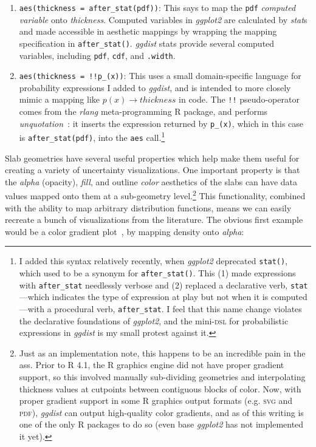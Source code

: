 \documentclass[journal]{vgtc}              %
\begin{document}
\begin{enumerate}
    \item \texttt{aes(thickness = after\_stat(pdf))}: This says to map the \texttt{pdf} \textit{computed variable} onto \textit{thickness}. Computed variables in \textit{ggplot2} are calculated by \textit{stat}s and made accessible in aesthetic mappings by wrapping the mapping specification in \texttt{after\_stat()}. \textit{ggdist} stats provide several computed variables, including \texttt{pdf}, \texttt{cdf}, and \texttt{.width}.
    \item \texttt{aes(thickness = !!p\_(x))}:  This uses a small domain-specific language for probability expressions I added to \textit{ggdist}, and is intended to more closely mimic a mapping like $p(x) \rightarrow thickness$ in code. The \texttt{!!} pseudo-operator comes from the \textit{rlang} meta-programming R package, and performs \textit{unquotation}~\cite{wickham2019advanced}: it inserts the expression returned by \texttt{p\_(x)}, which in this case is \texttt{after\_stat(pdf)}, into the \texttt{aes} call.\footnote{I added this syntax relatively recently, when \textit{ggplot2} deprecated \texttt{stat()}, which used to be a synonym for \texttt{after\_stat()}. This (1) made expressions with \texttt{after\_stat} needlessly verbose and (2) replaced a declarative verb, \texttt{stat}---which indicates the type of expression at play but not when it is computed---with a procedural verb, \texttt{after\_stat}. I feel that this name change violates the declarative foundations of \textit{ggplot2}, and the mini-\textsc{dsl} for probabilistic expressions in \textit{ggdist} is my small protest against it.}
\end{enumerate}

Slab geometries have several useful properties which help make them useful for creating a variety of uncertainty visualizations. One important property is that the \textit{alpha} (opacity), \textit{fill}, and outline \textit{color} aesthetics of the slabs can have data values mapped onto them at a sub-geometry level.\footnote{Just as an implementation note, this happens to be an incredible pain in the ass. Prior to R 4.1, the R graphics engine did not have proper gradient support, so this involved manually sub-dividing geometries and interpolating thickness values at cutpoints between contiguous blocks of color. Now, with proper gradient support in some R graphics output formats (e.g. \textsc{svg} and \textsc{pdf}), \textit{ggdist} can output high-quality color gradients, and as of this writing is one of the only R packages to do so (even base \textit{ggplot2} has not implemented it yet).} This functionality, combined with the ability to map arbitrary distribution functions, means we can easily recreate a bunch of visualizations from the literature. The obvious first example would be a color gradient plot~\cite{jackson2008displaying}, by mapping density onto \textit{alpha}:
\end{document}
